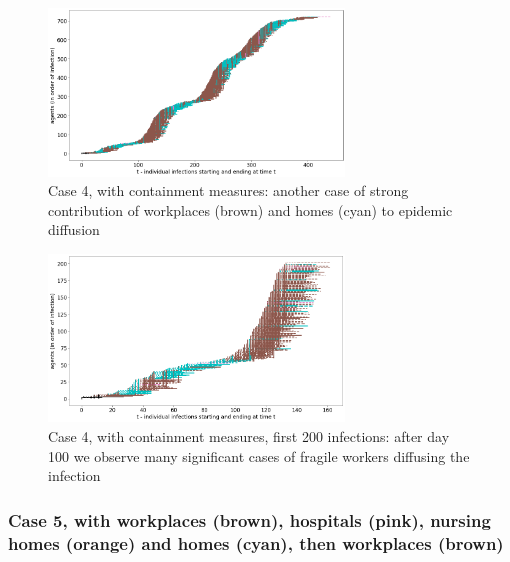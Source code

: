 \documentclass[11pt]{article}
\begin{document}
\begin{figure}[H]
\begin{center}
\includegraphics[width=0.7\textwidth]{with6a.png}%
\caption{Case 4, with containment measures: another case of strong contribution of workplaces (brown) and homes (cyan) to epidemic diffusion}
\label{6a}
\end{center}
\end{figure}

\begin{figure}[H]
\begin{center}
\includegraphics[width=0.7\textwidth]{with6b.png}%
\caption{Case 4, with containment measures, first 200 infections: after day 100 we observe many significant cases of fragile workers diffusing the infection}
\label{6b}
\end{center}
\end{figure}

\subsubsection{Case 5, with workplaces (brown), hospitals (pink), nursing homes (orange) and homes (cyan), then workplaces (brown)}
\label{c5}
\end{document}
